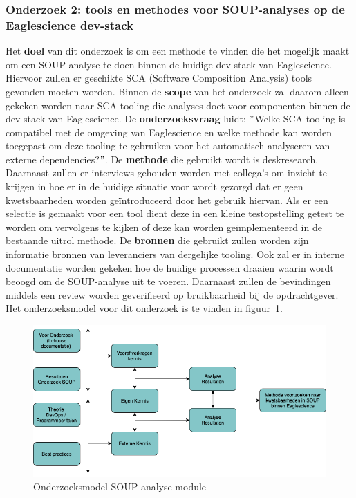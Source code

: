 \subsubsection{Onderzoek 2: tools en methodes voor SOUP-analyses op de Eaglescience dev-stack}
Het \textbf{doel} van dit onderzoek is om een methode te vinden die het mogelijk maakt om een SOUP-analyse te doen binnen de huidige dev-stack van Eaglescience. Hiervoor zullen er geschikte SCA (Software Composition Analysis) tools gevonden moeten worden. Binnen de \textbf{scope} van het onderzoek zal daarom alleen gekeken worden naar SCA tooling die analyses doet voor componenten binnen de dev-stack van Eaglescience. De \textbf{onderzoeksvraag} luidt: $"$Welke SCA tooling is compatibel met de omgeving van Eaglescience en welke methode kan worden toegepast om deze tooling te gebruiken voor het automatisch analyseren van externe dependencies?$"$. De \textbf{methode} die gebruikt wordt is deskresearch. Daarnaast zullen er interviews gehouden worden met collega's om inzicht te krijgen in hoe er in de huidige situatie voor wordt gezorgd dat er geen kwetsbaarheden worden geïntroduceerd door het gebruik hiervan. Als er een selectie is gemaakt voor een tool dient deze in een kleine testopstelling getest te worden om vervolgens te kijken of deze kan worden geïmplementeerd in de bestaande uitrol methode. De \textbf{bronnen} die gebruikt zullen worden zijn informatie bronnen van leveranciers van dergelijke tooling. Ook zal er in interne documentatie worden gekeken hoe de huidige processen draaien waarin wordt beoogd om de SOUP-analyse uit te voeren. Daarnaast zullen de bevindingen middels een review worden geverifieerd op bruikbaarheid bij de opdrachtgever. Het onderzoeksmodel voor dit onderzoek is te vinden in figuur~\ref{fig:OnderzoeksModelSOUPmethode}.

\begin{figure}[htbp]
    \myfloatalign
    \includegraphics[width=12cm]{gfx/OnderzoeksModelSOUPMethode}
    \caption{Onderzoeksmodel SOUP-analyse module}
    \label{fig:OnderzoeksModelSOUPmethode}
\end{figure}

